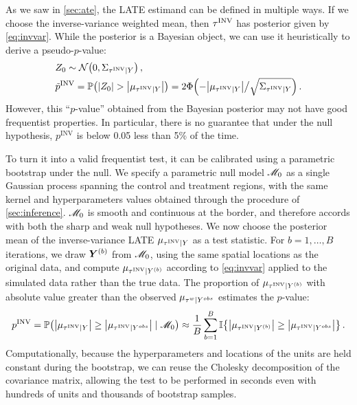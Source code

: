 As we saw in \autoref{sec:ate}, the LATE estimand can be defined in multiple ways.
If we choose the inverse-variance weighted mean, then \(\tau^{\mathrm{INV}}\) has posterior given by \autoref{eq:invvar}.
While the posterior is a Bayesian object, we can use it heuristically to derive a pseudo-\(p\)-value:
\begin{equation}
    \begin{split}
        & Z_0 \sim \normal\del{0, \Sigma_{\invvar \mid Y}} \,, \\
        & \tilde{p}^{\mathrm{INV}} = \Pr\del{ 
            \abs{Z_0} > 
            \abs{
                \mu_{
                    \invvar \mid Y
                }
            } 
        }
        = 2\Phi\del{-
            \abs{
                \mu_{
                    \invvar \mid Y
                }
            }
            \big/
            \sqrt{
                \Sigma_{\invvar \mid Y}
            }
    } \,.
\end{split}
\end{equation}
However, this ``\(p\)-value'' obtained from the Bayesian posterior may not have good frequentist properties.
In particular, there is no guarantee that under the null hypothesis, \(p^{\mathrm{INV}}\) is below 0.05 less than 5\% of the time.

To turn it into a valid frequentist test, it can be calibrated using a parametric bootstrap under the null.
We specify a parametric null model \(\mathscr{M}_0\)
as a single Gaussian process spanning the control and treatment regions,
with the same kernel and hyperparameters values obtained through the procedure of \autoref{sec:inference}.
\(\mathscr{M}_0\) is smooth and continuous at the border,
and therefore accords with both the sharp and weak null hypotheses.
We now choose the posterior mean of the inverse-variance LATE \(\mu_{\tau^{\mathrm{INV}} \mid Y}\) as a test statistic.
For \(b=1,\dotsc,B\) iterations, we draw \(\bm{Y}^{(b)}\) from \(\mathscr{M}_0\),
using the same spatial locations as the original data,
and compute \(\mu_{\tau^{\mathrm{INV}} \mid Y^{(b)}}\) according to \autoref{eq:invvar} applied to the simulated data rather than the true data.
The proportion of \(\mu_{\tau^{\mathrm{INV}} \mid Y^{(b)}}\) with absolute value greater than the observed \(\mu_{\tau^{w} \mid Y^{obs}}\) estimates the \(p\)-value:
\begin{equation}
    p^{\mathrm{INV}} = \Pr\del{ \abs{\mu_{\invvar \mid Y}} \ge \abs{\mu_{\invvar \mid Y^{obs}}} \mid \modnull} 
    \approx \frac{1}{B} 
    \sum_{b=1}^B 
        \Ind\cbr{
            \abs{
                \mu_{\invvar \mid Y^{(b)}}
            } 
            \ge  
            \abs{
                \mu_{\invvar \mid Y^{obs}}
            } 
        }
    \,.
\end{equation}
Computationally, because the hyperparameters and locations of the units are held constant during the bootstrap, we can reuse the Cholesky decomposition of the covariance matrix, allowing the test to be performed in seconds even with hundreds of units and thousands of bootstrap samples.

